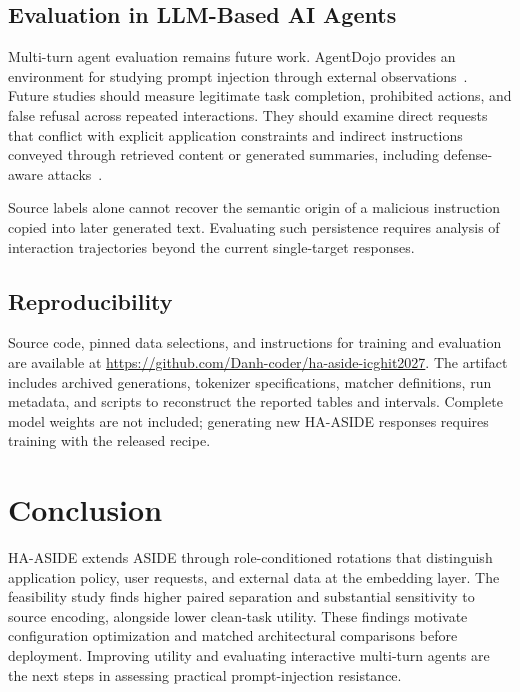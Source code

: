 \documentclass[conference,letterpaper,10pt]{IEEEtran}
\begin{document}
\subsection{Evaluation in LLM-Based AI Agents}
Multi-turn agent evaluation remains future work. AgentDojo provides an
environment for studying prompt injection through external
observations~\cite{debenedetti2024agentdojo}. Future studies should measure
legitimate task completion, prohibited actions, and false refusal across
repeated interactions. They should examine direct requests that conflict with
explicit application constraints and indirect instructions conveyed through
retrieved content or generated summaries, including defense-aware
attacks~\cite{nasr2026attacker}.

Source labels alone cannot recover the semantic origin of a malicious
instruction copied into later generated text. Evaluating such persistence
requires analysis of interaction trajectories beyond the current single-target
responses.

\subsection{Reproducibility}
Source code, pinned data selections, and instructions for training and
evaluation are available at
\url{https://github.com/Danh-coder/ha-aside-icghit2027}.
The artifact includes archived generations, tokenizer specifications,
matcher definitions, run metadata, and scripts to reconstruct the reported
tables and intervals. Complete model weights are not included; generating
new HA-ASIDE responses requires training with the released recipe.

\section{Conclusion}
HA-ASIDE extends ASIDE through role-conditioned rotations that distinguish
application policy, user requests, and external data at the embedding layer.
The feasibility study finds higher paired separation and substantial
sensitivity to source encoding, alongside lower clean-task utility. These
findings motivate configuration optimization and matched architectural
comparisons before deployment. Improving utility and evaluating interactive
multi-turn agents are the next steps in assessing practical prompt-injection
resistance.



\end{document}

